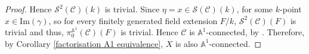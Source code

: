 \documentclass[11pt, reqno]{amsart}
\theoremstyle{plain}
\theoremstyle{definition}
\newcommand{\pr}{\mathrm{pr}}%
\renewcommand{\tilde}{\widetilde}
\newcommand{\sC}{{\mathcal C}}
\newcommand{\sS}{{\mathcal S}}
\newcommand{\A}{{\mathbb A}}
\begin{document}
\begin{proof}








 
 Hence $\sS^2(\sC)(k )$ is trivial. Since $\eta = x\in \sS(\sC)(k)$, for some $k$-point $x \in \text{Im}(\gamma)$, so for every finitely generated field extension $F/k$, $\sS^2(\sC)(F)$ is trivial and thus, $\pi_0^{\A^1}(\sC)(F)$ is trivial. Hence $\sC$ is $\A^1$-connected, by \cite[Lemma 3.3.6]{ictp}. Therefore, by Corollary \ref{factorisation A1 equivalence}, $X$ is also $\A^1$-connected. 
 \end{proof}
\end{document}
